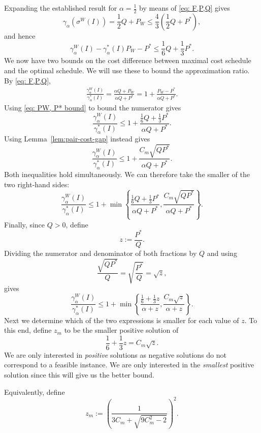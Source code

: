 \documentclass[%
english, titlepage=false %
]{./tum-templates/book/tumbook}
\begin{document}
Expanding the established result for $\alpha = \frac12$ by means of \eqref{eq: F,P,Q} gives
\[
\gamma_{\alpha}(\sigma^W(I))=
 \frac12Q+P_{W}
 \le
 \frac43\left(\frac12Q+P^*\right),
\]
and hence
\begin{equation}
 \gamma_{\alpha}^W(I)- \gamma_{\alpha}^*(I)P_W-P^*\le\frac16Q+\frac13P^*.
\label{eq: PW, P* bound}
\end{equation}
We now have two bounds on the cost difference between maximal cost 
schedule and the optimal schedule. We will use these to bound
the approximation ratio. By \eqref{eq: F,P,Q},
\[
\begin{aligned}
\frac{\gamma_{\alpha}^W(I)}{\gamma_{\alpha}^*(I)}
=
\frac{\alpha Q+P_W}{\alpha Q+P^*}
=
1+\frac{P_W-P^*}{\alpha Q+P^*}.
\end{aligned}
\]
Using \eqref{eq: PW, P* bound} to bound the numerator gives
\[
\frac{\gamma_{\alpha}^W(I)}{\gamma_{\alpha}^*(I)}
\le
1+
\frac{\frac16Q+\frac13P^*}{\alpha Q+P^*}.
\]
Using Lemma~\ref{lem:pair-cost-gap} instead gives
\[
\frac{\gamma_{\alpha}^W(I)}{\gamma_{\alpha}^*(I)}
\le
1+
\frac{C_m\sqrt{QP^*}}{\alpha Q+P^*}.
\]
Both inequalities hold simultaneously. We can therefore take the smaller
of the two right-hand sides:
\[
\frac{\gamma_{\alpha}^W(I)}{\gamma_{\alpha}^*(I)}
\le
1+
\min\left\{
\frac{\frac16Q+\frac13P^*}{\alpha Q+P^*},
\frac{C_m\sqrt{QP^*}}{\alpha Q+P^*}
\right\}.
\]
Finally, since \(Q>0\), define
\[
 z:=\frac{P^*}{Q}.
\]
Dividing the numerator and denominator of both fractions by \(Q\) and
using
\[
\frac{\sqrt{QP^*}}{Q}
=
\sqrt{\frac{P^*}{Q}}
=\sqrt z,
\]
gives
\begin{equation}
 \frac{\gamma_{\alpha}^W(I)}{\gamma_{\alpha}^*(I)}
 \le
 1+
 \min\left\{
 \frac{\frac16+\frac13z}{\alpha+z},
 \frac{C_m\sqrt z}{\alpha+z}
 \right\}.
\label{eq: ratio bound by min}
\end{equation}
Next we determine which of the two expressions is smaller for each value of $z$.
To this end, define \(z_m\) to be the smaller positive solution of
\begin{equation}
 \frac16+\frac13z=C_m\sqrt z.
\label{eq: equal bounds}
\end{equation}
We are only interested in \emph{positive} solutions as negative solutions do not 
correspond to a feasible instance. We are only interested in the \emph{smallest} positive solution
since this will give us the better bound. 

Equivalently, define
\begin{equation}
     z_m:=\left(\frac{1}{3C_m+\sqrt{9C_m^2-2}}\right)^2.
     \label{eq: z_m}
\end{equation}
\end{document}
